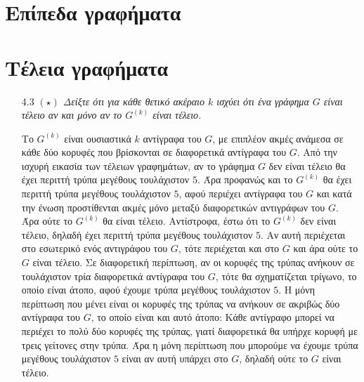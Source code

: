 \documentclass[a4paper, oneside, 11pt]{article}
\theoremstyle{definition}
\begin{document}
\section{Επίπεδα γραφήματα}
\section{Τέλεια γραφήματα}
\begin{enumerate}
	\item[4.3] \emph{$(\star)$ Δείξτε ότι για κάθε θετικό ακέραιο $k$ ισχύει ότι ένα γράφημα $G$ είναι τέλειο αν και μόνο αν το $G^{(k)}$ είναι τέλειο.}

Το $G^{(k)}$ είναι ουσιαστικά $k$ αντίγραφα του $G$, με επιπλέον ακμές ανάμεσα σε κάθε δύο κορυφές που βρίσκονται σε διαφορετικά αντίγραφα του $G$.
Από την ισχυρή εικασία των τέλειων γραφημάτων, αν το γράφημα $G$ δεν είναι τέλειο θα έχει περιττή τρύπα μεγέθους τουλάχιστον $5$. Άρα προφανώς και το $G^{(k)}$ θα έχει περιττή τρύπα μεγέθους τουλάχιστον
$5$, αφού περιέχει αντίγραφα του $G$ και κατά την ένωση προστίθενται ακμές μόνο μεταξύ διαφορετικών αντιγράφων του $G$. Άρα ούτε το $G^{(k)}$ θα είναι τέλειο.
Αντίστροφα, έστω ότι το $G^{(k)}$ δεν είναι τέλειο, δηλαδή έχει περιττή τρύπα μεγέθους τουλάχιστον $5$. Αν αυτή περιέχεται στο εσωτερικό ενός αντιγράφου του $G$, τότε περιέχεται και στο $G$ και άρα ούτε
το $G$ είναι τέλειο. Σε διαφορετική περίπτωση, αν οι κορυφές της τρύπας ανήκουν σε τουλάχιστον τρία διαφορετικά αντίγραφα του $G$, τότε θα σχηματίζεται τρίγωνο, το οποίο είναι άτοπο, αφού έχουμε τρύπα
μεγέθους τουλάχιστον $5$.
Η μόνη περίπτωση που μένει είναι οι κορυφές της τρύπας να ανήκουν σε ακριβώς δύο αντίγραφα του $G$, το οποίο είναι και αυτό άτοπο: Κάθε αντίγραφο μπορεί να περιέχει το πολύ δύο κορυφές της τρύπας, γιατί
διαφορετικά θα υπήρχε κορυφή με τρεις γείτονες στην τρύπα. Άρα η μόνη περίπτωση που μπορούμε να έχουμε τρύπα μεγέθους τουλάχιστον $5$ είναι αν αυτή υπάρχει στο $G$, δηλαδή ούτε το $G$ είναι τέλειο.

\end{enumerate}
\end{document}
